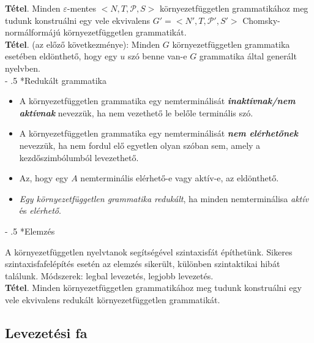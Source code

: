 \documentclass[12pt,margin=0px]{article}
\makeatletter
\renewcommand\paragraph{%
	\@startsection{paragraph}{4}{0mm}%
	{-\baselineskip}%
	{.5\baselineskip}%
	{\normalfont\normalsize\bfseries}}
\makeatother
\begin{document}
    \noindent \textbf{Tétel}. Minden $\varepsilon$-mentes $\Big<N,T,\mathcal{P},S\Big>$ környezetfüggetlen grammatikához meg tudunk konstruálni egy vele ekvivalens $G' = \Big<N',T,\mathcal{P}',S'\Big>$ Chomsky-normálformájú környezetfüggetlen grammatikát.\\
							
    \noindent \textbf{Tétel}. (az előző következménye): Minden $G$ környezetfüggetlen grammatika esetében eldönthető, hogy egy $u$ szó benne van-e $G$ grammatika által generált nyelvben.\\

	\paragraph*{Redukált grammatika}

	\begin{itemize}
        \item A környezetfüggetlen grammatika egy nemterminálisát \textbf{\emph{inaktívnak/nem aktívnak}} nevezzük, ha nem vezethető le belőle terminális szó.
        \item A környezetfüggetlen grammatika egy nemterminálisát \textbf{\emph{nem elérhetőnek}} nevezzük, ha nem fordul elő egyetlen olyan szóban sem, amely a kezdőszimbólumból levezethető.
        \item Az, hogy egy $A$ nemterminális elérhető-e vagy aktív-e, az eldönthető.
        \item \emph{Egy környezetfüggetlen grammatika redukált}, ha minden nemterminálisa \emph{aktív} és \emph{elérhető}.
    \end{itemize}
	
    \paragraph*{Elemzés}

    \noindent A környezetfüggetlen nyelvtanok segítségével szintaxisfát építhetünk. Sikeres szintaxisfafelépítés esetén az elemzés sikerült, különben szintaktikai hibát találunk. Módszerek: legbal levezetés, legjobb levezetés.\\

    \noindent \textbf{Tétel}. Minden környezetfüggetlen grammatikához meg tudunk konstruálni egy vele ekvivalens redukált környezetfüggetlen grammatikát.
	
	\subsection*{Levezetési fa}
\end{document}
